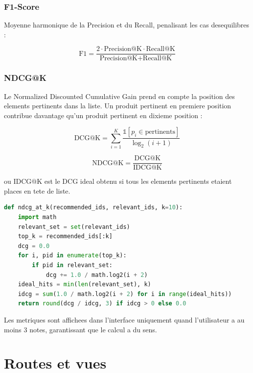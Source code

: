 \documentclass[12pt,a4paper]{report}
\begin{document}
\subsection{F1-Score}

Moyenne harmonique de la Precision et du Recall, penalisant les cas
desequilibres :

\begin{equation}
\text{F1} = \frac{2 \cdot \text{Precision@K} \cdot \text{Recall@K}}{\text{Precision@K} + \text{Recall@K}}
\end{equation}

\subsection{NDCG@K}

Le Normalized Discounted Cumulative Gain prend en compte la position des
elements pertinents dans la liste. Un produit pertinent en premiere position
contribue davantage qu'un produit pertinent en dixieme position :

\begin{equation}
\text{DCG@K} = \sum_{i=1}^{K} \frac{\mathbb{1}[p_i \in \text{pertinents}]}{\log_2(i + 1)}
\end{equation}

\begin{equation}
\text{NDCG@K} = \frac{\text{DCG@K}}{\text{IDCG@K}}
\end{equation}

ou $\text{IDCG@K}$ est le DCG ideal obtenu si tous les elements pertinents
etaient places en tete de liste.

\begin{lstlisting}[language=Python,caption={Implementation du NDCG@K}]
def ndcg_at_k(recommended_ids, relevant_ids, k=10):
    import math
    relevant_set = set(relevant_ids)
    top_k = recommended_ids[:k]
    dcg = 0.0
    for i, pid in enumerate(top_k):
        if pid in relevant_set:
            dcg += 1.0 / math.log2(i + 2)
    ideal_hits = min(len(relevant_set), k)
    idcg = sum(1.0 / math.log2(i + 2) for i in range(ideal_hits))
    return round(dcg / idcg, 3) if idcg > 0 else 0.0
\end{lstlisting}

Les metriques sont affichees dans l'interface uniquement quand l'utilisateur
a au moins 3 notes, garantissant que le calcul a du sens.

\chapter{Routes et vues}
\end{document}
